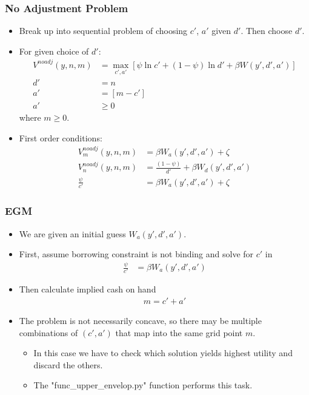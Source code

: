 \documentclass[english,xcolor=svgnames]{beamer}
\begin{document}
\begin{frame}
    \frametitle{No Adjustment Problem}
    \begin{itemize}
        \item Break up into sequential problem of choosing $c'$, $a'$ given $d'$. Then choose $d'$.
        \item For given choice of $d'$:
        \begin{align*}
            V^{noadj}(y,n,m) &= \max_{c',a'}[\psi \ln c' +(1-\psi) \ln d' + \beta W(y',d',a')] \\
            d' &= n \\
            a' &= \left[m - c'    \right] \\
            a' &\ge 0
        \end{align*}
        where $m \ge 0$.
        \item First order conditions:
        \begin{align*}
            V_m^{noadj}(y,n,m) &= \beta W_a(y',d',a') + \zeta \\
            V_n^{noadj}(y,n,m) &=\frac{(1-\psi)}{d'} + \beta W_d(y',d',a') \\
            \frac{\psi}{c'} &= \beta W_a(y',d',a')  + \zeta 
        \end{align*}
    \end{itemize}
\end{frame}


\begin{frame}
    \frametitle{EGM}
    \begin{itemize}
        \item We are given an initial guess $W_a(y',d',a')$.
        \item First, assume borrowing constraint is not binding and solve for $c'$ in 
        \begin{align*}
            \frac{\psi}{c'} &= \beta  W_a(y',d',a') 
        \end{align*}
        \item Then calculate implied cash on hand
        \begin{align*}
            m = c' + a' 
        \end{align*}
        \item The problem is not necessarily concave, so there may be multiple combinations of $(c',a')$ that map into the same grid point $m$.
        \begin{itemize}
            \item In this case we have to check which solution yields highest utility and discard the others.
            \item The "func\_upper\_envelop.py" function performs this task.
        \end{itemize}
    \end{itemize}
\end{frame}
\end{document}

